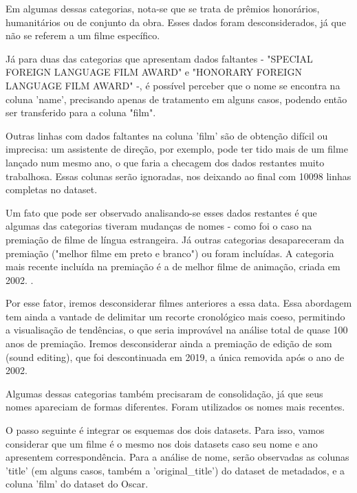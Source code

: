             Em algumas dessas categorias, nota-se que se trata de prêmios honorários, humanitários ou de conjunto da obra. Esses dados foram desconsiderados, já que não se referem a um filme específico.
            
            Já para duas das categorias que apresentam dados faltantes - "SPECIAL FOREIGN LANGUAGE FILM AWARD"
            e "HONORARY FOREIGN LANGUAGE FILM AWARD" -, é possível perceber que o nome se encontra na coluna 'name', precisando apenas de tratamento em alguns casos, podendo então ser transferido para a coluna "film".
            
            Outras linhas com dados faltantes na coluna 'film' são de obtenção difícil ou imprecisa: um assistente de direção, por exemplo, pode ter tido mais de um filme lançado num mesmo ano, o que faria a checagem dos dados restantes muito trabalhosa. Essas colunas serão ignoradas, nos deixando ao final com 10098 linhas completas no dataset.
            
            Um fato que pode ser observado analisando-se esses dados restantes é que algumas das categorias tiveram mudanças de nomes - como foi o caso na premiação de filme de língua estrangeira. Já outras categorias desapareceram da premiação ("melhor filme em preto e branco") ou foram incluídas. A categoria mais recente incluída na premiação é a de melhor filme de animação, criada em 2002. \cite{usatoday2002}.
            
            Por esse fator, iremos desconsiderar filmes anteriores a essa data. Essa abordagem tem ainda a vantade de delimitar um recorte cronológico mais coeso, permitindo a visualisação de tendências, o que seria improvável na análise total de quase 100 anos de premiação. Iremos desconsiderar ainda a premiação de edição de som (sound editing), que foi descontinuada em 2019, a única removida após o ano de 2002.\cite{deadline2020}
            
            Algumas dessas categorias também precisaram de consolidação, já que seus nomes apareciam de formas diferentes. Foram utilizados os nomes mais recentes.
            
            O passo seguinte é integrar os esquemas dos dois datasets. Para isso, vamos considerar que um filme é o mesmo nos dois datasets caso seu nome e ano apresentem correspondência. Para a análise de nome, serão observadas as colunas 'title' (em alguns casos, também a 'original\_title') do dataset de metadados, e a coluna 'film' do dataset do Oscar. 
            
